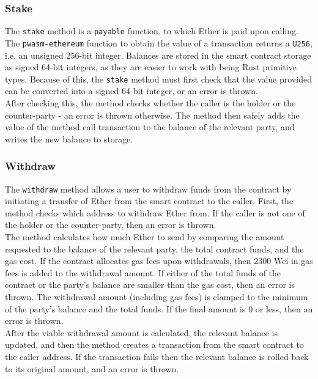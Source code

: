 \subsubsection{Stake}

The \texttt{stake} method is a \texttt{payable} function, to which Ether is paid upon calling. The \texttt{pwasm-ethereum} function to obtain the value of a transaction returns a \texttt{U256}, i.e. an unsigned 256-bit integer. Balances are stored in the smart contract storage as signed 64-bit integers, as they are easier to work with being Rust primitive types. Because of this, the \texttt{stake} method must first check that the value provided can be converted into a signed 64-bit integer, or an error is thrown. \\

After checking this, the method checks whether the caller is the holder or the counter-party - an error is thrown otherwise. The method then safely adds the value of the method call transaction to the balance of the relevant party, and writes the new balance to storage.


\subsubsection{Withdraw}

The \texttt{withdraw} method allows a user to withdraw funds from the contract by initiating a transfer of Ether from the smart contract to the caller. First, the method checks which address to withdraw Ether from. If the caller is not one of the holder or the counter-party, then an error is thrown. \\

The method calculates how much Ether to send by comparing the amount requested to the balance of the relevant party, the total contract funds, and the gas cost. If the contract allocates gas fees upon withdrawals, then 2300 Wei in gas fees is added to the withdrawal amount. If either of the total funds of the contract or the party's balance are smaller than the gas cost, then an error is thrown. The withdrawal amount (including gas fees) is clamped to the minimum of the party's balance and the total funds. If the final amount is 0 or less, then an error is thrown. \\

After the viable withdrawal amount is calculated, the relevant balance is updated, and then the method creates a transaction from the smart contract to the caller address. If the transaction fails then the relevant balance is rolled back to its original amount, and an error is thrown.


